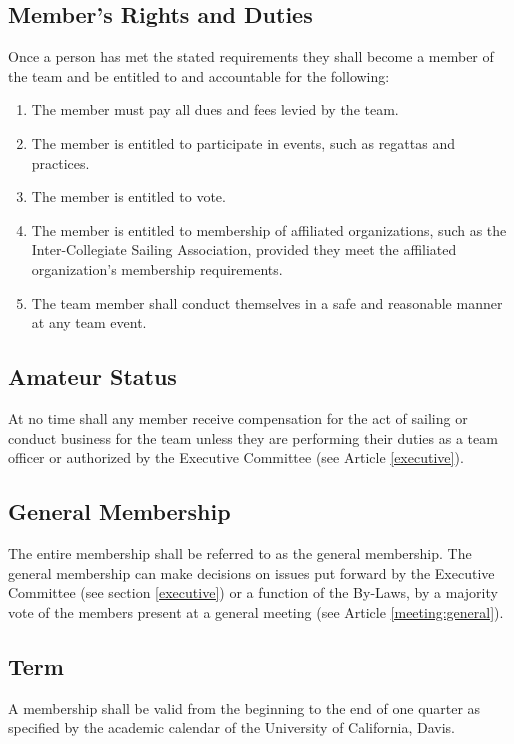 \documentclass[12pt,titlepage,letter]{article}
\begin{document}
\subsection{Member's Rights and Duties \label{member:duties}}
Once a person has met the stated requirements they shall become a member of the team and be entitled to and accountable for the following:
\begin{enumerate}
\item
The member must pay all dues and fees levied by the team. 
\item
The member is entitled to participate in events, such as regattas and practices.
\item
The member is entitled to vote.
\item
The member is entitled to membership of affiliated organizations, such as the Inter-Collegiate Sailing Association, provided they meet the affiliated organization's membership requirements.
\item
The team member shall conduct themselves in a safe and reasonable manner at any team event.
\end{enumerate}

\subsection{Amateur Status \label{member:amateur}}
At no time shall any member receive compensation for the act of sailing or conduct business for the team unless they are performing their duties as a team officer or authorized by the Executive Committee (see Article \ref{executive}).

\subsection{General Membership \label{member:general}}
The entire membership shall be referred to as the general membership. The general membership can make decisions on issues put forward by the Executive Committee (see section \ref{executive}) or a function of the By-Laws, by a majority vote of the members present at a general meeting (see Article \ref{meeting:general}). 

\subsection{Term \label{member:term}}
A membership shall be valid from the beginning to the end of one quarter as specified by the academic calendar of the University of California, Davis.
\end{document}
